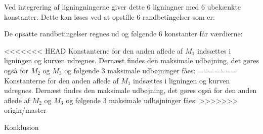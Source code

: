 Ved integrering af ligningningerne giver dette 6 ligningner med 6 ubekænkte konstanter. Dette kan løses ved at opstille 6 randbetingelser som er: 


De opsatte randbetingelser regnes ud og følgende 6 konstanter får værdierne: 


<<<<<<< HEAD
Konstanterne for den anden aflede af $M_1$ indsættes i ligningen og kurven udregnes. Dernæst findes den maksimale udbøjning, det gøres også for $M_2$ og $M_3$ og følgende 3 maksimale udbøjninger fåes: 
=======
Konstanterne for den anden aflede af $M_1$ indsættes i ligningen og kurven udregnes. Dernæst findes den maksimale udbøjning, det gøres også for den anden aflede af $M_2$ og $M_3$ og følgende 3 maksimale udbøjninger fåes: 
>>>>>>> origin/master


Konklusion